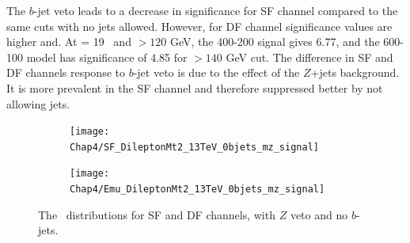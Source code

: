 The $b$-jet veto leads to a decrease in significance for SF channel compared to the same cuts with no jets allowed. However, for DF channel significance values are higher and. At \lumi= 19 \invfb \, and \mttwo $>120$ GeV, the 400-200 signal gives  6.77, and the 600-100 model has significance of 4.85 for  \mttwo$>140$ GeV cut. The difference in SF and DF channels response to $b$-jet veto is due to the effect of the $Z$+jets background. It is more prevalent in the SF channel and therefore suppressed better by not allowing jets. 

 

\begin{figure}[H]	   
	\begin{subfigure}[t]{0.5\textwidth}
		\label{fig:SF_0jets_mz_mt2}
        \texttt{[image: Chap4/SF\_DileptonMt2\_13TeV\_0bjets\_mz\_signal]} 
        \end{subfigure} 
     \begin{subfigure}[t]{0.5\textwidth}
     	\label{fig:SF_0jets_mz_metrel}
        \texttt{[image: Chap4/Emu\_DileptonMt2\_13TeV\_0bjets\_mz\_signal]} 
        \end{subfigure}
        \captionsetup{width=0.8\textwidth}
\caption{The \mttwo \, distributions for SF and DF channels, with $Z$ veto and no $b$-jets.}	
        \label{fig:SF_0bjets_mz}
\end{figure}
